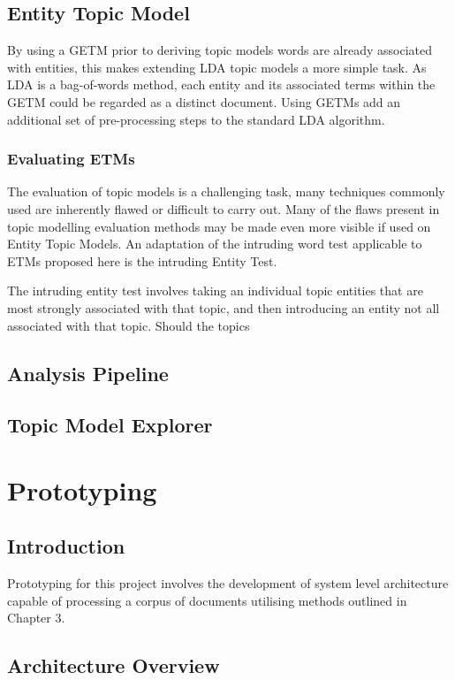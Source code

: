 \documentclass[10pt]{report}
\begin{document}
\section{Entity Topic Model}
By using a GETM prior to deriving topic models words are already associated with entities, this makes extending LDA topic models a more simple task. As LDA is a bag-of-words method, each entity and its associated terms within the GETM could be regarded as a distinct document. Using GETMs add an additional set of pre-processing steps to the standard LDA algorithm.

\subsection{Evaluating ETMs}
The evaluation of topic models is a challenging task, many techniques commonly used are inherently flawed or difficult to carry out. Many of the flaws present in topic modelling evaluation methods may be made even more visible if used on Entity Topic Models. An adaptation of the intruding word test applicable to ETMs proposed here is the intruding Entity Test.

The intruding entity test involves taking an individual topic entities that are most strongly associated with that topic, and then introducing an entity not all associated with that topic. Should the topics 

\section{Analysis Pipeline}


\section{Topic Model Explorer}


%
%
%
%
%
\chapter{Prototyping}
\section{Introduction}
Prototyping for this project involves the development of system level architecture capable of processing a corpus of documents utilising methods outlined in Chapter 3.
\section{Architecture Overview}
\end{document}
